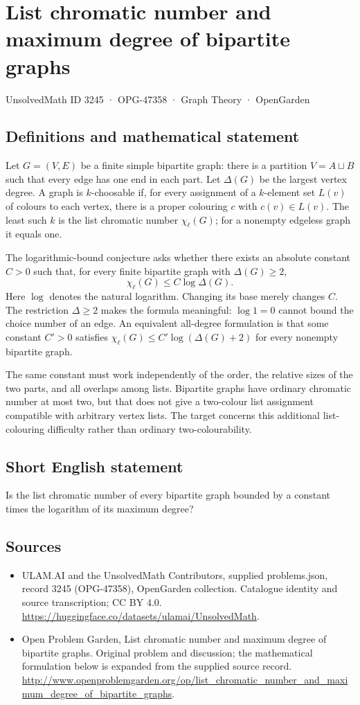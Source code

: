 \documentclass[11pt,a4paper]{article}
\begin{document}
\section*{List chromatic number and maximum degree of bipartite graphs}\label{3245}
{\small UnsolvedMath ID 3245 · OPG-47358 · Graph Theory · OpenGarden}
\subsection{Definitions and mathematical statement}
Let $G=(V,E)$ be a finite simple bipartite graph: there is a partition
$V=A\sqcup B$ such that every edge has one end in each part. Let
$\Delta(G)$ be the largest vertex degree. A graph is $k$-choosable if, for
every assignment of a $k$-element set $L(v)$ of colours to each vertex,
there is a proper colouring $c$ with $c(v)\in L(v)$. The least such $k$
is the list chromatic number $\chi_\ell(G)$; for a nonempty edgeless graph
it equals one.

The logarithmic-bound conjecture asks whether there exists an absolute
constant $C>0$ such that, for every finite bipartite graph with
$\Delta(G)\ge2$,
\[
                      \chi_\ell(G)\le C\log\Delta(G).
\]
Here $\log$ denotes the natural logarithm. Changing its base merely
changes $C$. The restriction $\Delta\ge2$ makes the formula meaningful:
$\log1=0$ cannot bound the choice number of an edge. An equivalent
all-degree formulation is that some constant $C'>0$ satisfies
$\chi_\ell(G)\le C'\log(\Delta(G)+2)$ for every nonempty bipartite graph.

The same constant must work independently of the order, the relative
sizes of the two parts, and all overlaps among lists. Bipartite graphs
have ordinary chromatic number at most two, but that does not give a
two-colour list assignment compatible with arbitrary vertex lists.
The target concerns this additional list-colouring difficulty rather
than ordinary two-colourability.
\subsection{Short English statement}
Is the list chromatic number of every bipartite graph bounded by a constant times the logarithm of its maximum degree?
\subsection{Sources}
\begin{itemize}
\item[S1] ULAM.AI and the UnsolvedMath Contributors, supplied problems.json, record 3245 (OPG-47358), OpenGarden collection. Catalogue identity and source transcription; CC BY 4.0.
\url{https://huggingface.co/datasets/ulamai/UnsolvedMath}.
\item[S2] Open Problem Garden, List chromatic number and maximum degree of bipartite graphs. Original problem and discussion; the mathematical formulation below is expanded from the supplied source record.
\url{http://www.openproblemgarden.org/op/list_chromatic_number_and_maximum_degree_of_bipartite_graphs}.
\end{itemize}
\end{document}
